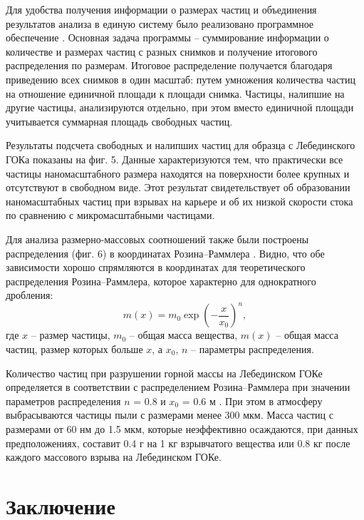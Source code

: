 Для удобства получения информации о размерах частиц и объединения результатов анализа в единую систему было реализовано программное обеспечение \cite{bib10}. Основная задача программы – суммирование информации о количестве и размерах частиц с разных снимков и получение итогового распределения по размерам. Итоговое распределение получается благодаря приведению всех снимков в один масштаб: путем умножения количества частиц на отношение единичной площади к площади снимка. Частицы, налипшие на другие частицы, анализируются отдельно, при этом вместо единичной площади учитывается суммарная площадь свободных частиц.

Результаты подсчета свободных и налипших частиц для образца с Лебединского ГОКа показаны на фиг. 5. Данные характеризуются тем, что практически все частицы наномасштабного размера находятся на поверхности более крупных и отсутствуют в свободном виде. Этот результат свидетельствует об образовании наномасштабных частиц при взрывах на карьере и об их низкой скорости стока по сравнению с микромасштабными частицами.

Для анализа размерно-массовых соотношений также были построены распределения (фиг. 6) в координатах Розина–Раммлера \cite{bib13}. Видно, что обе зависимости хорошо спрямляются в координатах для теоретического распределения Розина–Раммлера, которое характерно для однократного дробления: 
$$
m(x) = m_{0} \exp ⁡\left( - \frac{x}{x_{0}} \right) ^{n},
$$
где $x$ – размер частицы, $m_{0}$ – общая масса вещества, $m(x)$ – общая масса частиц, размер которых больше $x$, а $x_{0}$, $n$ – параметры распределения. 

Количество частиц при разрушении горной массы на Лебединском ГОКе определяется в соответствии с распределением Розина–Раммлера при значении параметров распределения $n$ = 0.8 и $x_{0}$ = 0.6 м \cite{bib11}. При этом в атмосферу выбрасываются частицы пыли с размерами менее 300 мкм. Масса частиц с размерами от 60 нм до 1.5 мкм, которые неэффективно осаждаются, при данных предположениях, составит 0.4 г на 1 кг взрывчатого вещества или 0.8 кг после каждого массового взрыва на Лебединском ГОКе.

\section{Заключение} \label{sect2_4}

